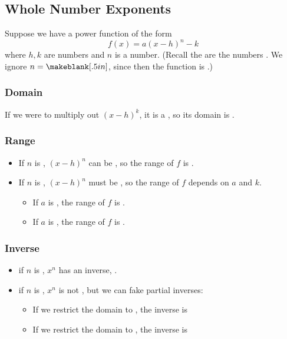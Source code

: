 \subsection{Whole Number Exponents} 
Suppose we have a power function of the form
\[
f(x)=a(x-h)^n-k
\]
where $h,k$ are \makeblank[1in] numbers and $n$ is a \makeblank[1in] number. (Recall the \makeblank[1in] are the numbers \makeblank. We ignore $n=\makeblank[.5in]$, since then the function is \makeblank[1in].)
\subsubsection*{Domain}
If we were to multiply out $(x-h)^k$, it is a \makeblank[1.5in], so its domain is \makeblank.
\subsubsection*{Range}
\begin{itemize}
\item If $n$ is \makeblank[1in], $(x-h)^n$ can be \makeblank[1.5in], so the range of $f$ is \makeblank.
\item If $n$ is \makeblank[1in], $(x-h)^n$ must be \makeblank[1.5in], so the range of $f$ depends on $a$ and $k$.
\begin{itemize}
\item If $a$ is \makeblank[1in], the range of $f$ is \makeblank.
\item If $a$ is \makeblank[1in], the range of $f$ is \makeblank.
\end{itemize}
\end{itemize}
\subsubsection*{Inverse}
\begin{itemize}
\item if $n$ is \makeblank[1in], $x^n$ has an inverse, \makeblank.
\item if $n$ is \makeblank[1in], $x^n$ is not \makeblank, but we can fake partial inverses:
\begin{itemize}
\item If we restrict the domain to \makeblank[1in], the inverse is \makeblank[1in]
\item If we restrict the domain to \makeblank[1in], the inverse is \makeblank[1in]
\end{itemize}
\end{itemize}